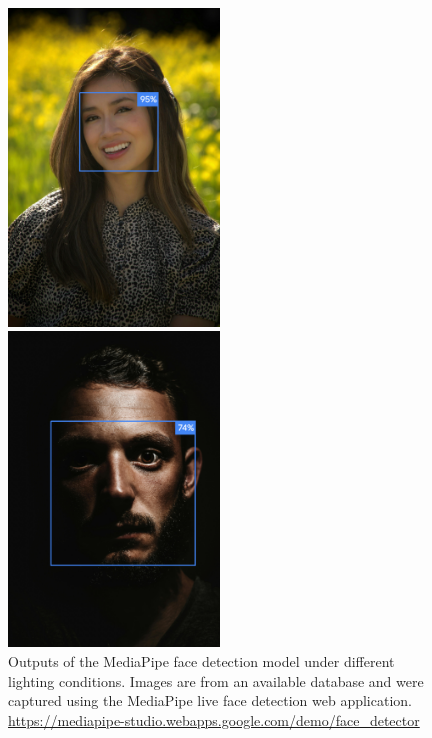 \begin{figure}[ht]
	\centering
	\begin{minipage}{0.5\textwidth}
		\centering
		\includegraphics[width=0.5\textwidth]{images/face_detection_good.png}
	\end{minipage}%
	\begin{minipage}{0.5\textwidth}
		\centering
		\includegraphics[width=0.5\textwidth]{images/face_detection.png}
	\end{minipage}
	\caption[Outputs of the MediaPipe face detection model]{Outputs of the MediaPipe face detection model under different lighting conditions. Images are from an available database and were captured using the MediaPipe live face detection web application. \url{https://mediapipe-studio.webapps.google.com/demo/face_detector}}
	\label{fig:face_detections} %
\end{figure}



